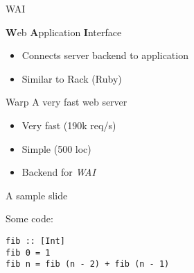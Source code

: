 \documentclass[20pt]{beamer}
\begin{document}
\begin{frame}{WAI}

    {\bf W}eb {\bf A}pplication {\bf I}nterface
    \begin{itemize}
        \item Connects server backend to application
        \item Similar to Rack (Ruby)
    \end{itemize}
\end{frame}

\begin{frame}{Warp}
    A very fast web server
    \begin{itemize}
        \item Very fast (190k req/s)
        \item Simple (500 loc)
        \item Backend for \emph{WAI}
    \end{itemize}
\end{frame}


\begin{frame}[fragile]{A sample slide}

Some code:

\begin{lstlisting}
fib :: [Int]
fib 0 = 1
fib n = fib (n - 2) + fib (n - 1)
\end{lstlisting}

\end{frame}
\end{document}
